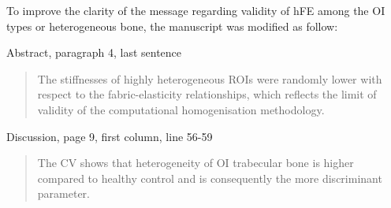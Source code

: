 \documentclass{AR2RC}
\begin{document}







To improve the clarity of the message regarding validity of hFE among the OI types or heterogeneous bone, the manuscript was modified as follow:

Abstract, paragraph 4, last sentence
\begin{quote}
	The stiffnesses of highly heterogeneous ROIs were randomly lower with respect to the fabric-elasticity relationships, which reflects the limit of validity of the computational homogenisation methodology. 
\end{quote}

Discussion, page 9, first column, line 56-59
\begin{quote}
	The CV shows that heterogeneity of OI trabecular bone is higher compared to healthy control and is consequently the more discriminant parameter. 
\end{quote}
\end{document}
